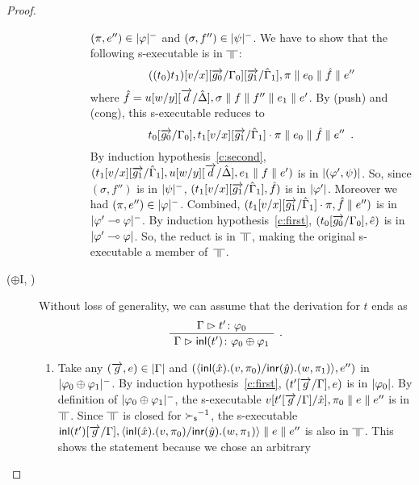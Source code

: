 \begin{proof}
\begin{description}
\begin{enumerate}[label=\textit{(\arabic{*})}]
\begin{description}
		     $(\pi,e'')\in|{\varphi}|^-$ and
		     $(\sigma,f'')\in|{\psi}|^-$.
		     We have to show that the following s-executable is in $\bbot$:
		     \[
		     ((t_0)t_1)[v/x][\overrightarrow{g_0}/\Gamma_0][\overrightarrow{g_1}/\hat{\Gamma}_1],\pi\parallel
		     {e_0}
		     \parallel\hat{f}\parallel
		     e''
		     \]
		     where
		     $\hat f = u[w/y][\overrightarrow{d}/\hat{\Delta}],\sigma\parallel
		     {f}\parallel f''\parallel {e_1}\parallel e'$.
		     By (push) and (cong), this s-executable reduces
		     to
		     \[
		     t_0[\overrightarrow{g_0}/\Gamma_0],t_1[v/x][\overrightarrow{g_1}/\hat{\Gamma}_1]\cdot \pi\parallel
		     {e_0}
		     \parallel\hat{f}\parallel
		     e''\enspace.
		     \]
		     By induction hypothesis~\ref{c:second},
		     $(t_1[v/x][\overrightarrow{g_1}/\hat{\Gamma}_1],
		     u[w/y][\overrightarrow{d}/\hat{\Delta}], {e_1}\parallel {f}\parallel
		     e')$ is in $|{(\varphi',\psi)}|$.
		     So, since $(\sigma,f'')$ is in $|{\psi}|^-$,
		     $(t_1[v/x][\overrightarrow{g_1}/\hat{\Gamma}_1],\hat f)$ is in
		     $|{\varphi'}|$.
		     Moreover we had $(\pi,e'')\in|{\varphi}|^-$.
		     Combined,
		     $(t_1[v/x][\overrightarrow{g_1}/\hat{\Gamma}_1]\cdot\pi,\hat f\parallel e'')$
		     is in $|{\varphi'\multimap\varphi}|^-$\kern -1pt.
		     By induction hypothesis~\ref{c:first},
		     $(t_0[\overrightarrow{g_0}/\Gamma_0],\hat e)$ is in
		     $|{\varphi'\multimap\varphi}|$.
		     So, the reduct is in $\bbot$, making the original
		     s-executable a member of~$\bbot$.
	       \end{description}
	\end{enumerate}
   \item[($\oplus$I, \textminus)]
       Without loss of generality, we can assume that the
       derivation for $t$ ends as
       \[
       \aseq{\G}{\tj{t'}{\phi_0}}
       \useq{\G}{\tj{\inl{t'}}{\phi_0\oplus\phi_1}}
       \DisplayProof\enspace.
       \]
       \begin{enumerate}[label=\textit{(\arabic{*})}]
        \item Take any $(\overrightarrow g, e)\in|{\Gamma}|$ and
              $(\langle \mathsf{inl}({\hat x}). ({v},{\pi_0})/ \mathsf{inr}({\hat y}). ({w},{\pi_1})\rangle, e'')$
              in $|{\varphi_0\oplus\varphi_1}|^-$.
              By induction hypothesis~\ref{c:first},
              $(t'[\overrightarrow g/\Gamma], e)$ is in $|{\varphi_0}|$.
              By definition of $|{\varphi_0\oplus\varphi_1}|^-$,
              the s-executable
              $v[t'[\overrightarrow g/\Gamma]/\hat x],\pi_0\parallel{e}\parallel e''$
              is in
              $\bbot$.
              Since $\bbot$ is closed for ${\succ_{\mathsf s}}^{-1}$,
              the s-executable
              $\mathsf{inl}({t'})[\overrightarrow g/\Gamma], \langle \mathsf{inl}({\hat x}). ({v},{\pi_0})/ \mathsf{inr}({\hat
              y}). ({w},{\pi_1})\rangle
              \parallel{e}\parallel e''$
              is also in $\bbot$.
              This shows the statement because we chose an arbitrary

\end{enumerate}
\end{description}
\end{proof}
